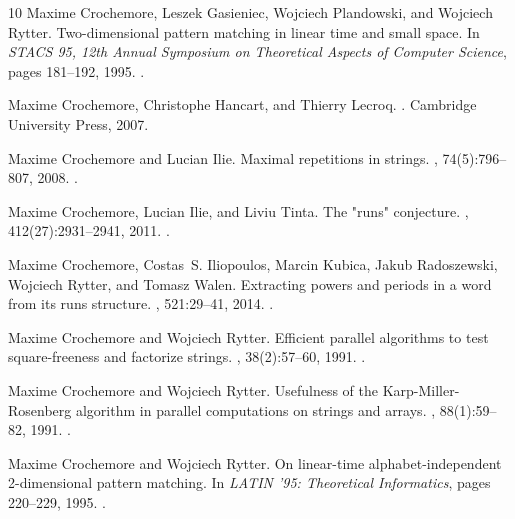 \documentclass[11pt,letterpaper]{article}
\begin{document}
\begin{thebibliography}{10}
Maxime Crochemore, Leszek Gasieniec, Wojciech Plandowski, and Wojciech Rytter.
\newblock Two-dimensional pattern matching in linear time and small space.
\newblock In {\em {STACS} 95, 12th Annual Symposium on Theoretical Aspects of
  Computer Science}, pages 181--192, 1995.
\newblock \href {https://doi.org/10.1007/3-540-59042-0\_72}
  {}.

Maxime Crochemore, Christophe Hancart, and Thierry Lecroq.
.
\newblock Cambridge University Press, 2007.

Maxime Crochemore and Lucian Ilie.
\newblock Maximal repetitions in strings.
, 74(5):796--807, 2008.
\newblock \href {https://doi.org/10.1016/j.jcss.2007.09.003}
  {}.

Maxime Crochemore, Lucian Ilie, and Liviu Tinta.
\newblock The "runs" conjecture.
, 412(27):2931--2941, 2011.
\newblock \href {https://doi.org/10.1016/j.tcs.2010.06.019}
  {}.

Maxime Crochemore, Costas~S. Iliopoulos, Marcin Kubica, Jakub Radoszewski,
  Wojciech Rytter, and Tomasz Walen.
\newblock Extracting powers and periods in a word from its runs structure.
, 521:29--41, 2014.
\newblock \href {https://doi.org/10.1016/J.TCS.2013.11.018}
  {}.

Maxime Crochemore and Wojciech Rytter.
\newblock Efficient parallel algorithms to test square-freeness and factorize
  strings.
, 38(2):57--60, 1991.
\newblock \href {https://doi.org/10.1016/0020-0190(91)90223-5}
  {}.

Maxime Crochemore and Wojciech Rytter.
\newblock Usefulness of the {Karp-Miller-Rosenberg} algorithm in parallel
  computations on strings and arrays.
, 88(1):59--82, 1991.
\newblock \href {https://doi.org/10.1016/0304-3975(91)90073-B}
  {}.

Maxime Crochemore and Wojciech Rytter.
\newblock On linear-time alphabet-independent 2-dimensional pattern matching.
\newblock In {\em {LATIN} '95: Theoretical Informatics}, pages 220--229, 1995.
\newblock \href {https://doi.org/10.1007/3-540-59175-3\_91}
  {}.


\end{thebibliography}
\end{document}
